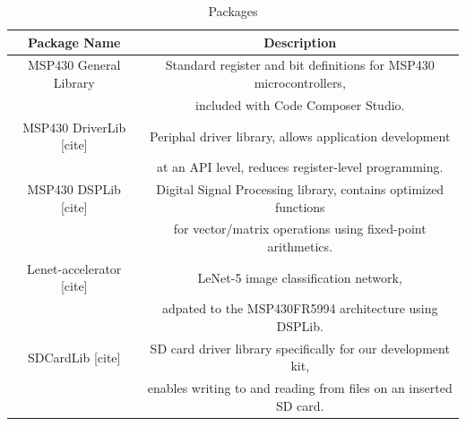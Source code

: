 \documentclass[twoside]{report}
\begin{document}
\begin{table}
    \begin{center}
        \begin{tabular}{ |c|c| }
            \hline
            \textbf{Package Name} & \textbf{Description} \\
            \hline
            MSP430 General Library & Standard register and bit definitions for MSP430 microcontrollers, \\
                                   & included with Code Composer Studio. \\
            \hline
            MSP430 DriverLib [cite] & Periphal driver library, allows application development \\
                                    & at an API level, reduces register-level programming.\\
            \hline
            MSP430 DSPLib [cite] & Digital Signal Processing library, contains optimized functions\\
                                 & for vector/matrix operations using fixed-point arithmetics.\\
            \hline
            Lenet-accelerator [cite] & LeNet-5 image classification network,\\
                                     & adpated to the MSP430FR5994 architecture using DSPLib.\\
            \hline
            SDCardLib [cite] & SD card driver library specifically for our development kit, \\
                             & enables writing to and reading from files on an inserted SD card. \\
            \hline
        \end{tabular} 
        \caption{Packages}
        \label{tab:packages}
    \end{center}
\end{table}
\end{document}
